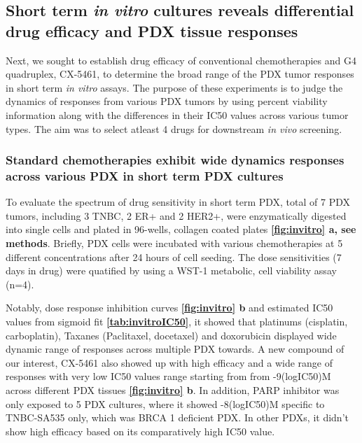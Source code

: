 

\subsection{Short term \textit {in vitro} cultures reveals differential drug efficacy and PDX tissue responses
}
Next, we sought to establish drug efficacy of conventional chemotherapies and G4 quadruplex, CX-5461, to determine the broad range of the PDX tumor responses in short term \textit{in vitro} assays. The purpose of these experiments is to judge the dynamics of responses from various PDX tumors by using percent viability information along with the differences in their IC50 values across various tumor types. 
The aim was to select atleast 4 drugs for downstream \textit{in vivo} screening.

\subsubsection{Standard chemotherapies exhibit wide dynamics responses across various PDX in short term PDX cultures}

To evaluate the spectrum of drug sensitivity in short term PDX,
total of 7 PDX tumors, including 3 TNBC, 2 ER+ and 2 HER2+, were enzymatically digested into single cells and plated in 96-wells, collagen coated plates \textbf{\autoref{fig:invitro} a, see methods}. 
Briefly, PDX cells were incubated with various chemotherapies at 5 different concentrations after 24 hours of cell seeding. The dose sensitivities (7 days in drug) were quatified by using a WST-1 metabolic, cell viability assay (n=4). 

Notably, dose response inhibition curves \textbf{\autoref{fig:invitro} b} and estimated IC50 values from sigmoid fit \textbf{\autoref{tab:invitroIC50}}, it showed that platinums (cisplatin, carboplatin), Taxanes (Paclitaxel, docetaxel) and doxorubicin displayed wide dynamic range of responses across multiple PDX towards. A new compound of our interest, CX-5461 also showed up with high efficacy and a wide range of responses with very low IC50 values range starting from from -9(logIC50)M across different PDX tissues \textbf{\autoref{fig:invitro} b}. In addition, PARP inhibitor was only exposed to 5 PDX cultures, where it showed -8(logIC50)M specific to TNBC-SA535 only, which was BRCA 1 deficient PDX. In other PDXs, it didn't show high efficacy based on its comparatively high IC50 value.

